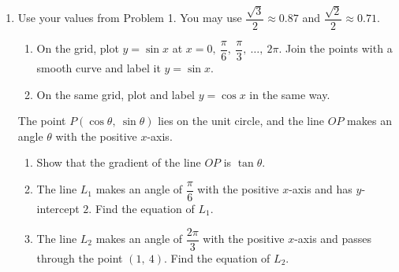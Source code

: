 \documentclass[12pt, twoside]{article}
\begin{document}
\begin{enumerate}[itemsep=0.15cm]
\item[2.]

Use your values from Problem 1. You may use
$\dfrac{\sqrt{3}}{2} \approx 0.87$ and $\dfrac{\sqrt{2}}{2} \approx 0.71$.

\begin{enumerate}[itemsep=0.1cm]
  \item On the grid, plot $y = \sin x$ at $x = 0,\ \dfrac{\pi}{6},\
  \dfrac{\pi}{3},\ \dots,\ 2\pi$. Join the points with a smooth curve and
  label it $y = \sin x$.
  \item On the same grid, plot and label $y = \cos x$ in the same way.
\end{enumerate}

The point $P\left(\cos\theta,\ \sin\theta\right)$ lies on the unit circle,
and the line $OP$ makes an angle $\theta$ with the positive $x$-axis.

\begin{enumerate}[itemsep=0.1cm]
  \item[(c)] Show that the gradient of the line $OP$ is $\tan\theta$.
  \item[(d)] The line $L_{1}$ makes an angle of $\dfrac{\pi}{6}$ with the
  positive $x$-axis and has $y$-intercept $2$. Find the equation of $L_{1}$.
  \item[(e)] The line $L_{2}$ makes an angle of $\dfrac{2\pi}{3}$ with the
  positive $x$-axis and passes through the point $(1,\ 4)$. Find the
  equation of $L_{2}$.
\end{enumerate}


\end{enumerate}
\end{document}
